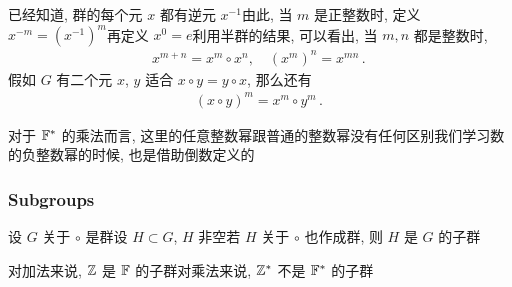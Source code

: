\begin{definition}
    已经知道, 群的每个元 $x$ 都有逆元 $x^{-1}$\period 由此, 当 $m$ 是正整数时, 定义 $x^{-m} = (x^{-1})^m$\period 再定义 $x^0 = e$\period 利用半群的结果, 可以看出, 当 $m,n$ 都是整数时,
    \begin{align*}
        x^{m+n} = x^m \circ x^n, \quad (x^m)^n = x^{mn} \period
    \end{align*}
    假如 $G$ 有二个元 $x$, $y$ 适合 $x \circ y = y \circ x$, 那么还有
    \begin{align*}
        (x \circ y)^m = x^m \circ y^m \period
    \end{align*}
\end{definition}

\begin{example}
    对于 $\mathbb{F}^{\ast}$ 的乘法而言, 这里的任意整数幂跟普通的整数幂没有任何区别\period 我们学习数的负整数幂的时候, 也是借助倒数定义的\period
\end{example}

\subsubsection*{Subgroups}

\begin{definition}
    设 $G$ 关于 $\circ$ 是群\period 设 $H \subset G$, $H$ 非空\period 若 $H$ 关于 $\circ$ 也作成群, 则 $H$ 是 $G$ 的子群 \period
\end{definition}

\begin{example}
    对加法来说, $\mathbb{Z}$ 是 $\mathbb{F}$ 的子群\period 对乘法来说, $\mathbb{Z}^{\ast}$ 不是 $\mathbb{F}^{\ast}$ 的子群\period
\end{example}

